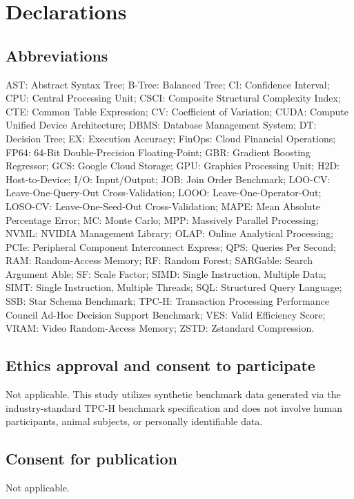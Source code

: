 \documentclass[10pt,a4paper]{article}
\begin{document}
\section*{Declarations}

\subsection*{Abbreviations}
AST: Abstract Syntax Tree; B-Tree: Balanced Tree; CI: Confidence Interval; CPU: Central Processing Unit; CSCI: Composite Structural Complexity Index; CTE: Common Table Expression; CV: Coefficient of Variation; CUDA: Compute Unified Device Architecture; DBMS: Database Management System; DT: Decision Tree; EX: Execution Accuracy; FinOps: Cloud Financial Operations; FP64: 64-Bit Double-Precision Floating-Point; GBR: Gradient Boosting Regressor; GCS: Google Cloud Storage; GPU: Graphics Processing Unit; H2D: Host-to-Device; I/O: Input/Output; JOB: Join Order Benchmark; LOO-CV: Leave-One-Query-Out Cross-Validation; LOOO: Leave-One-Operator-Out; LOSO-CV: Leave-One-Seed-Out Cross-Validation; MAPE: Mean Absolute Percentage Error; MC: Monte Carlo; MPP: Massively Parallel Processing; NVML: NVIDIA Management Library; OLAP: Online Analytical Processing; PCIe: Peripheral Component Interconnect Express; QPS: Queries Per Second; RAM: Random-Access Memory; RF: Random Forest; SARGable: Search Argument Able; SF: Scale Factor; SIMD: Single Instruction, Multiple Data; SIMT: Single Instruction, Multiple Threads; SQL: Structured Query Language; SSB: Star Schema Benchmark; TPC-H: Transaction Processing Performance Council Ad-Hoc Decision Support Benchmark; VES: Valid Efficiency Score; VRAM: Video Random-Access Memory; ZSTD: Zstandard Compression.

\subsection*{Ethics approval and consent to participate}
Not applicable. This study utilizes synthetic benchmark data generated via the industry-standard TPC-H benchmark specification \cite{tpc2022tpch} and does not involve human participants, animal subjects, or personally identifiable data.

\subsection*{Consent for publication}
Not applicable.
\end{document}
